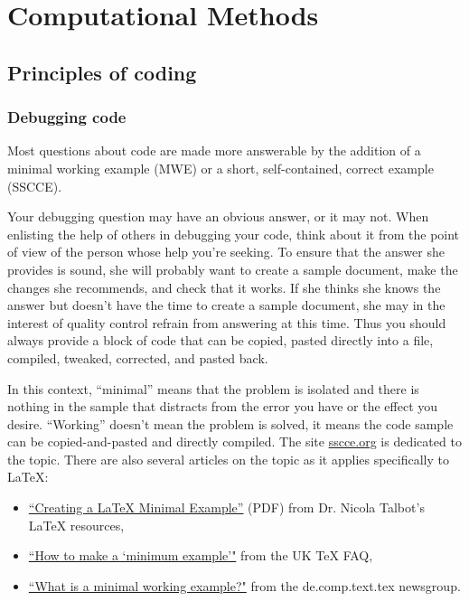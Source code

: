 \chapter{Computational Methods}\label{chap_CompMethods}

\section{Principles of coding}
\subsection{Debugging code}
Most questions about code are made more answerable by the addition of a minimal working example (MWE) or a short, self-contained, correct example (SSCCE).

Your debugging question may have an obvious answer, or it may not. When enlisting the help of others in debugging your code, think about it from the point of view of the person whose help you're seeking. To ensure that the answer she provides is sound, she will probably want to create a sample document, make the changes she recommends, and check that it works. If she thinks she knows the answer but doesn't have the time to create a sample document, she may in the interest of quality control refrain from answering at this time. Thus you should always provide a block of code that can be copied, pasted directly into a file, compiled, tweaked, corrected, and pasted back.

In this context, ``minimal'' means that the problem is isolated and there is nothing in the sample that distracts from the error you have or the effect you desire. ``Working'' doesn't mean the problem is solved, it means the code sample can be copied-and-pasted and directly compiled. The site \href{http://www.sscce.org}{sscce.org} is dedicated to the topic. There are also several articles on the topic as it applies specifically to LaTeX:

\begin{itemize}
\item \href{http://theoval.cmp.uea.ac.uk/~nlct/latex/minexample/minexample.pdf}{``Creating a LaTeX Minimal Example''} (PDF) from Dr. Nicola Talbot's LaTeX resources,
\item \href{http://www.tex.ac.uk/cgi-bin/texfaq2html?label=minxampl}{``How to make a `minimum example'"} from the UK \TeX{} FAQ,
\item \href{http://www.minimalbeispiel.de/mini-en.html}{``What is a minimal working example?"} from the de.comp.text.tex newsgroup.
\end{itemize}


